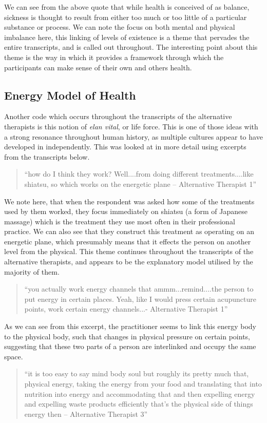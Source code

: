 We can see from the above quote that while health is conceived of as balance, sickness is thought to result from either too much or too little of a particular substance or process. We can note the focus on both mental and physical imbalance here, this linking of levels of existence is a theme that pervades the entire transcripts, and is called out throughout. The interesting point about this theme is the way in which it provides a framework through which the participants can make sense of their own and others health. 

\subsection{Energy Model of Health}

Another code which occurs throughout the transcripts of the alternative therapists is this notion of \textit{elan vital}, or life force. This is one of those ideas with a strong resonance throughout human history, as multiple cultures appear to have developed in independently. This was  looked at  in more detail using excerpts from the transcripts below. 

\begin{quotation}
``how do I think they work? Well....from doing different treatments....like shiatsu, so which works on the energetic plane – Alternative Therapist 1''  
\end{quotation}


We note here, that when the respondent was asked how some of the treatments used by them worked, they focus immediately on shiatsu (a form of Japanese massage) which is the treatment they use most often in their professional practice. We can also see that they construct this treatment as operating on an energetic plane, which presumably means that it effects the person on another level from the physical. This theme continues throughout the transcripts of the alternative therapists, and appears to be the explanatory model utilised by the majority of them. 

\begin{quotation}
``you actually work energy channels that ammm...remind....the person to put energy in certain places. Yeah, like I would press certain acupuncture points, work certain energy channels...- Alternative Therapist 1''  
\end{quotation}


As we can see from this excerpt, the practitioner seems to link this energy body to the physical body, such that changes in physical pressure on certain points, suggesting that these two parts of a person are interlinked and occupy the same space. 
\begin{quotation}
``it is too easy to say mind body soul but roughly its pretty much that, physical energy, taking the energy from your food and translating that into nutrition into energy and accommodating that and then expelling energy and expelling waste products efficiently that's the physical side of things energy then – Alternative Therapist 3''  
\end{quotation}


